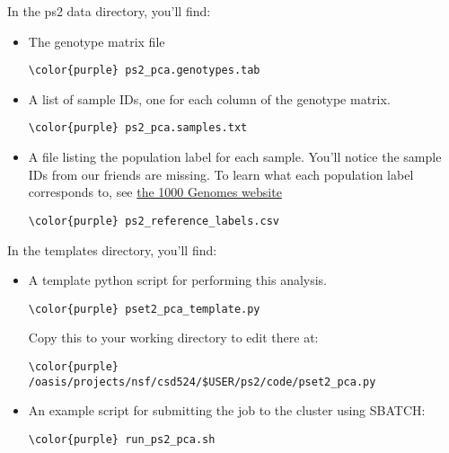 \documentclass[12pt]{article}
\begin{document}
In the ps2 data directory, you'll find:

\begin{itemize}
\item The genotype matrix file
\begin{Verbatim}[commandchars=\\\{\}]
\color{purple} ps2_pca.genotypes.tab
\end{Verbatim}
\item A list of sample IDs, one for each column of the genotype matrix.
\begin{Verbatim}[commandchars=\\\{\}]
\color{purple} ps2_pca.samples.txt
\end{Verbatim}
\item A file listing the population label for each sample. You'll notice the sample IDs from our friends are missing. To learn what each population label corresponds to, see \href{http://www.internationalgenome.org/category/population/}{the 1000 Genomes website}
\begin{Verbatim}[commandchars=\\\{\}]
\color{purple} ps2_reference_labels.csv
\end{Verbatim}
\end{itemize}

In the templates directory, you'll find:
\begin{itemize}
\item A template python script for performing this analysis.
\begin{Verbatim}[commandchars=\\\{\}]
\color{purple} pset2_pca_template.py
\end{Verbatim}
Copy this to your working directory to edit there at:
\begin{Verbatim}[commandchars=\\\{\}]
\color{purple} /oasis/projects/nsf/csd524/$USER/ps2/code/pset2_pca.py
\end{Verbatim}

\item An example script for submitting the job to the cluster using SBATCH:
\begin{Verbatim}[commandchars=\\\{\}]
\color{purple} run_ps2_pca.sh
\end{Verbatim}
\end{itemize}
\end{document}
